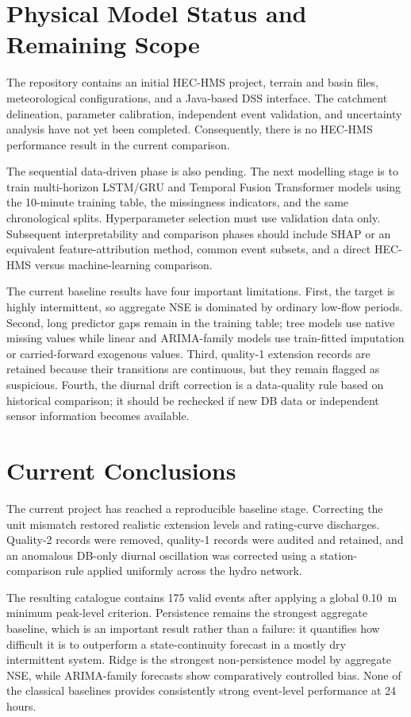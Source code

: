 \documentclass[twocolumn,twoside,a4paper,10pt]{IEEEtran}
\begin{document}
\section{Physical Model Status and Remaining Scope\label{sec:future}}

The repository contains an initial HEC-HMS project, terrain and basin files,
meteorological configurations, and a Java-based DSS interface. The catchment
delineation, parameter calibration, independent event validation, and
uncertainty analysis have not yet been completed. Consequently, there is no
HEC-HMS performance result in the current comparison.

The sequential data-driven phase is also pending. The next modelling stage is
to train multi-horizon LSTM/GRU and Temporal Fusion Transformer models using
the 10-minute training table, the missingness indicators, and the same
chronological splits. Hyperparameter selection must use validation data only.
Subsequent interpretability and comparison phases should include SHAP or an
equivalent feature-attribution method, common event subsets, and a direct
HEC-HMS versus machine-learning comparison.

The current baseline results have four important limitations. First, the
target is highly intermittent, so aggregate NSE is dominated by ordinary
low-flow periods. Second, long predictor gaps remain in the training table;
tree models use native missing values while linear and ARIMA-family models
use train-fitted imputation or carried-forward exogenous values. Third,
quality-1 extension records are retained because their transitions are
continuous, but they remain flagged as suspicious. Fourth, the diurnal drift
correction is a data-quality rule based on historical comparison; it should
be rechecked if new DB data or independent sensor information becomes
available.

\section{Current Conclusions\label{sec:conclusions}}

The current project has reached a reproducible baseline stage. Correcting the
unit mismatch restored realistic extension levels and rating-curve discharges.
Quality-2 records were removed, quality-1 records were audited and retained,
and an anomalous DB-only diurnal oscillation was corrected using a
station-comparison rule applied uniformly across the hydro network.

The resulting catalogue contains 175 valid events after applying a global
0.10~m minimum peak-level criterion. Persistence remains the strongest
aggregate baseline, which is an important result rather than a failure: it
quantifies how difficult it is to outperform a state-continuity forecast in a
mostly dry intermittent system. Ridge is the strongest non-persistence model
by aggregate NSE, while ARIMA-family forecasts show comparatively controlled
bias. None of the classical baselines provides consistently strong
event-level performance at 24 hours.
\end{document}
